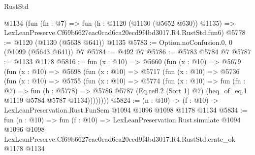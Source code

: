 \begin{lexlean}{RustStd}
\begin{coremodule}
    @1134
    (fun (fn : @7) =>
    fun (h : @1120 (@1130 (@5652 @630)) @1135) =>
    LexLeanPreserve.Cf69b6627eac0cad6ca20ecd9f4bd3017.R4.RustStd.fun6)
@5778 := @1120 (@1130 (@5638 @641)) @1135
@5783 := Option.noConfusion.{0, 0} (@1099 (@5643 @641)) @7
@5784 := @492 @7
@5786 := @5783 @5784 @7
@5787 := @1133 @1178
@5816 := fun (x : @10) =>
  @5660
    (fun (x : @10) =>
    @5679
      (fun (x : @10) =>
      @5698
        (fun (x : @10) =>
        @5717
          (fun (x : @10) =>
          @5736
            (fun (x : @10) =>
            @5755
              (fun (x : @10) =>
              @5774
                (fun (x : @10) =>
                fun (fn : @7) =>
                fun (h : @5778) =>
                @5786 @5787 (Eq.refl.{2} (Sort 1) @7) (heq_of_eq.{1} @1119 @5784 @5787 @1134))))))))
@5824 := (n : @10) -> (f : @10) -> LexLeanPreservation.Rust.FunSem @1094 @1096 @1098 @1178 @1134
@5834 := fun (n : @10) =>
  fun (f : @10) =>
  LexLeanPreservation.Rust.simulate
    @1094
    @1096
    @1098
    LexLeanPreserve.Cf69b6627eac0cad6ca20ecd9f4bd3017.R4.RustStd.crate_ok
    @1178
    @1134
\end{coremodule}
\end{lexlean}
